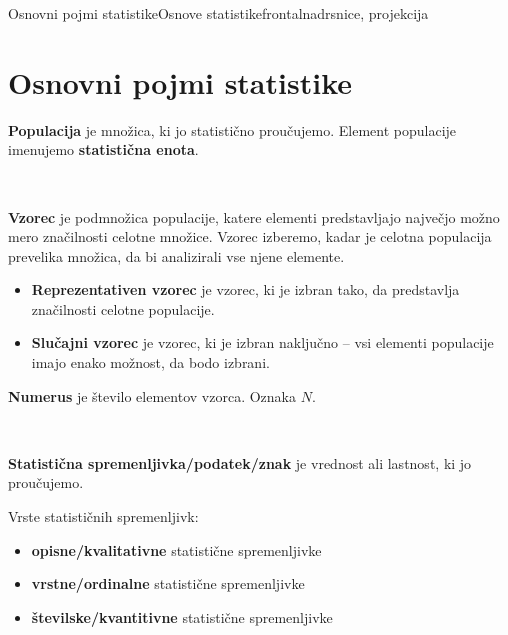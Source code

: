 \begin{priprava}{1}{}{Osnovni pojmi statistike}{Osnove statistike}{frontalna}{drsnice, projekcija}

    \section{Osnovni pojmi statistike}

        

            
                \textbf{Populacija} je množica, ki jo statistično proučujemo. 
                Element populacije imenujemo \textbf{statistična enota}. 
            
                ~
            
                \textbf{Vzorec} je podmnožica populacije, katere elementi predstavljajo največjo možno mero značilnosti celotne množice. 
                Vzorec izberemo, kadar je celotna populacija prevelika množica, da bi analizirali vse njene elemente. 
                
                \begin{itemize}
                    \item \textbf{Reprezentativen vzorec} je vzorec, ki je izbran tako, da predstavlja značilnosti celotne populacije.
                    \item \textbf{Slučajni vzorec} je vzorec, ki je izbran naključno -- vsi elementi populacije imajo enako možnost, da bodo izbrani.
                \end{itemize}

                \textbf{Numerus} je število elementov vzorca. Oznaka $N$. 
            
                ~
            
                \textbf{Statistična spremenljivka/podatek/znak} je vrednost ali lastnost, ki jo proučujemo.
            

                Vrste statističnih spremenljivk:
                \begin{itemize}
                    \item \textbf{opisne/kvalitativne} statistične spremenljivke
                    \item \textbf{vrstne/ordinalne} statistične spremenljivke
                    \item \textbf{številske/kvantitivne} statistične spremenljivke
                \end{itemize}
                
            


\end{priprava}
